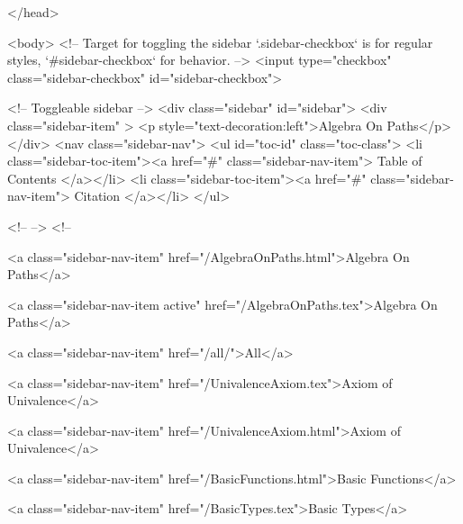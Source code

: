   
</head>




  <body>
    <!-- Target for toggling the sidebar `.sidebar-checkbox` is for regular
     styles, `#sidebar-checkbox` for behavior. -->
<input type="checkbox" class="sidebar-checkbox" id="sidebar-checkbox">

<!-- Toggleable sidebar -->
<div class="sidebar" id="sidebar">
  <div class="sidebar-item" >
    <p style="text-decoration:left">Algebra On Paths</p>
  </div>
  <nav class="sidebar-nav">
    <ul id="toc-id" class="toc-class">
  <li class="sidebar-toc-item"><a href="#" class="sidebar-nav-item"> Table of Contents </a></li>
  <li class="sidebar-toc-item"><a href="#" class="sidebar-nav-item"> Citation </a></li>
</ul>


    <!--  -->
    <!-- 
      
    
      
    
      
    
      
        
      
    
      
        
          <a class="sidebar-nav-item" href="/AlgebraOnPaths.html">Algebra On Paths</a>
        
      
    
      
        
          <a class="sidebar-nav-item active" href="/AlgebraOnPaths.tex">Algebra On Paths</a>
        
      
    
      
        
          <a class="sidebar-nav-item" href="/all/">All</a>
        
      
    
      
        
          <a class="sidebar-nav-item" href="/UnivalenceAxiom.tex">Axiom of Univalence</a>
        
      
    
      
        
          <a class="sidebar-nav-item" href="/UnivalenceAxiom.html">Axiom of Univalence</a>
        
      
    
      
        
          <a class="sidebar-nav-item" href="/BasicFunctions.html">Basic Functions</a>
        
      
    
      
        
          <a class="sidebar-nav-item" href="/BasicTypes.tex">Basic Types</a>
        
